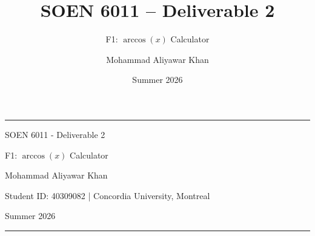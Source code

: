 \documentclass[aspectratio=169]{beamer}
\title{SOEN 6011 -- Deliverable 2}
\subtitle{F1: \(\arccos(x)\) Calculator}
\author{Mohammad Aliyawar Khan}
\institute{Concordia University}
\date{Summer 2026}
\begin{document}
\begin{frame}[plain]
\centering
\vspace{0.65cm}

{\color{navy}\rule{0.82\textwidth}{1.4pt}\par}
\vspace{0.55cm}

{\color{navy}SOEN 6011 - Deliverable 2\par}
\vspace{0.12cm}

{\color{blueaccent}\Large F1: \(\arccos(x)\) Calculator\par}
\vspace{0.7cm}


\vfill

{\large Mohammad Aliyawar Khan\par}
\vspace{0.10cm}
{\normalsize Student ID: 40309082 \quad | \quad Concordia University, Montreal\par}
\vspace{0.12cm}
{\normalsize Summer 2026\par}

\vspace{0.45cm}
{\color{navy}\rule{0.82\textwidth}{1.4pt}\par}
\end{frame}
\end{document}
